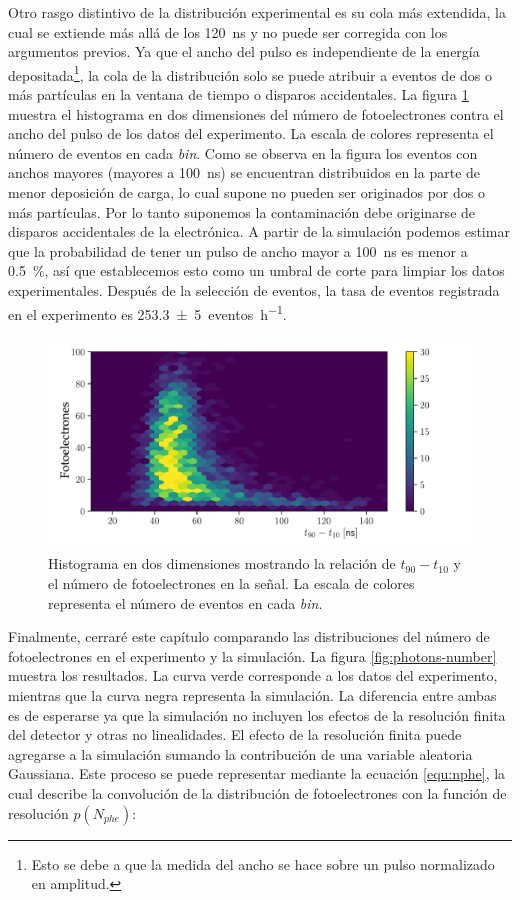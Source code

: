 Otro rasgo distintivo de la distribución experimental es su cola más extendida, la cual se extiende más allá de los \SI{120}{\ns} y no puede ser corregida con los argumentos previos. Ya que el ancho del pulso es independiente de la energía depositada\footnote{Esto se debe a que la medida del ancho se hace sobre un pulso normalizado en amplitud.}, la cola de la distribución solo se puede atribuir a eventos de dos o más partículas en la ventana de tiempo o disparos accidentales. La figura \ref{fig:qtime-dist} muestra el histograma en dos dimensiones del número de fotoelectrones contra el ancho del pulso de los datos del experimento. La escala de colores representa el número de eventos en cada \emph{bin}. Como se observa en la figura los eventos con anchos mayores (mayores a \SI{100}{\ns}) se encuentran distribuidos en la parte de menor deposición de carga, lo cual supone no pueden ser originados por dos o más partículas. Por lo tanto suponemos la contaminación debe originarse de disparos accidentales de la electrónica. A partir de la simulación podemos estimar que la probabilidad de tener un pulso de ancho mayor a \SI{100}{\ns} es menor a \SI{0.5}{\percent}, así que establecemos esto como un umbral de corte para limpiar los datos experimentales. Después de la selección de eventos, la tasa de eventos registrada en el experimento es \SI{253.3(50)}{eventos\per\hour}.

\begin{figure}
        \centering
        \includegraphics[width=\textwidth]{qtime-dist.pdf}
        \caption{Histograma en dos dimensiones mostrando la relación de $t_{90}-t_{10}$ y el número de fotoelectrones en la señal. La escala de colores representa el número de eventos en cada \emph{bin}.}
        \label{fig:qtime-dist}
\end{figure}

Finalmente, cerraré este capítulo comparando las distribuciones del número de fotoelectrones en el experimento y la simulación. La figura \ref{fig:photons-number} muestra los resultados. La curva verde corresponde a los datos del experimento, mientras que la curva negra representa la simulación. La diferencia entre ambas es de esperarse ya que la simulación no incluyen los efectos de la resolución finita del detector y otras no linealidades. El efecto de la resolución finita puede agregarse a la simulación sumando la contribución de una variable aleatoria Gaussiana. Este proceso se puede representar mediante la ecuación \ref{equ:nphe}, la cual describe la convolución de la distribución de fotoelectrones con la función de resolución $p(N_{phe})$:

